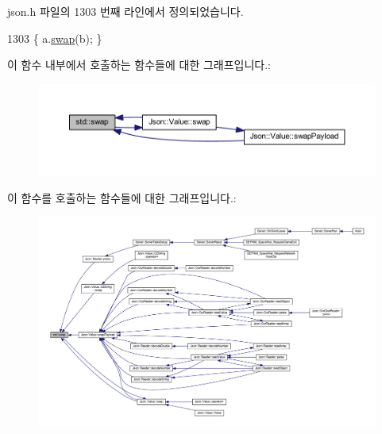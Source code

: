 json.\+h 파일의 1303 번째 라인에서 정의되었습니다.


\begin{DoxyCode}
1303 \{ a.\hyperlink{class_json_1_1_value_aab841120d78e296e1bc06a373345e822}{swap}(b); \}
\end{DoxyCode}
이 함수 내부에서 호출하는 함수들에 대한 그래프입니다.\+:\nopagebreak
\begin{figure}[H]
\begin{center}
\leavevmode
\includegraphics[width=350pt]{namespacestd_a22cc6fcbbb1f2f705c7888b615e43582_cgraph}
\end{center}
\end{figure}
이 함수를 호출하는 함수들에 대한 그래프입니다.\+:\nopagebreak
\begin{figure}[H]
\begin{center}
\leavevmode
\includegraphics[width=350pt]{namespacestd_a22cc6fcbbb1f2f705c7888b615e43582_icgraph}
\end{center}
\end{figure}
